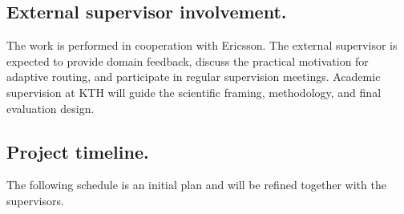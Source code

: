 \documentclass[11pt, a4paper]{article}
\begin{document}
\subsection{External supervisor involvement.} The work is performed in cooperation with Ericsson. The external supervisor is expected to provide domain feedback, discuss the practical motivation for adaptive routing, and participate in regular supervision meetings. Academic supervision at KTH will guide the scientific framing, methodology, and final evaluation design.

\subsection{Project timeline.} The following schedule is an initial plan and will be refined together with the supervisors.
\end{document}
